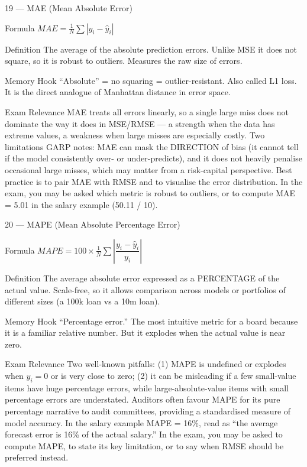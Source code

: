 \documentclass[aspectratio=169,8pt]{beamer}
\begin{document}
	\begin{frame}{19 --- MAE (Mean Absolute Error)}
		\begin{block}{Formula}
			$MAE = \frac{1}{N}\sum|y_i - \hat{y}_i|$
		\end{block}
		\begin{block}{Definition}
			The average of the absolute prediction errors. Unlike MSE it does not square, so it is robust to outliers. Measures the raw size of errors.
		\end{block}
		\begin{block}{Memory Hook}
			``Absolute'' = no squaring = outlier-resistant. Also called L1 loss. It is the direct analogue of Manhattan distance in error space.
		\end{block}
		\begin{block}{Exam Relevance}
			MAE treats all errors linearly, so a single large miss does not dominate the way it does in MSE/RMSE --- a strength when the data has extreme values, a weakness when large misses are especially costly. Two limitations GARP notes: MAE can mask the DIRECTION of bias (it cannot tell if the model consistently over- or under-predicts), and it does not heavily penalise occasional large misses, which may matter from a risk-capital perspective. Best practice is to pair MAE with RMSE and to visualise the error distribution. In the exam, you may be asked which metric is robust to outliers, or to compute MAE = 5.01 in the salary example (50.11 / 10).
		\end{block}
	\end{frame}
	
	\begin{frame}{20 --- MAPE (Mean Absolute Percentage Error)}
		\begin{block}{Formula}
			$MAPE = 100 \times \frac{1}{N}\sum\left|\dfrac{y_i - \hat{y}_i}{y_i}\right|$
		\end{block}
		\begin{block}{Definition}
			The average absolute error expressed as a PERCENTAGE of the actual value. Scale-free, so it allows comparison across models or portfolios of different sizes (a 100k loan vs a 10m loan).
		\end{block}
		\begin{block}{Memory Hook}
			``Percentage error.'' The most intuitive metric for a board because it is a familiar relative number. But it explodes when the actual value is near zero.
		\end{block}
		\begin{block}{Exam Relevance}
			Two well-known pitfalls: (1) MAPE is undefined or explodes when $y_i = 0$ or is very close to zero; (2) it can be misleading if a few small-value items have huge percentage errors, while large-absolute-value items with small percentage errors are understated. Auditors often favour MAPE for its pure percentage narrative to audit committees, providing a standardised measure of model accuracy. In the salary example MAPE = 16\%, read as ``the average forecast error is 16\% of the actual salary.'' In the exam, you may be asked to compute MAPE, to state its key limitation, or to say when RMSE should be preferred instead.
		\end{block}
	\end{frame}
	
\end{document}
